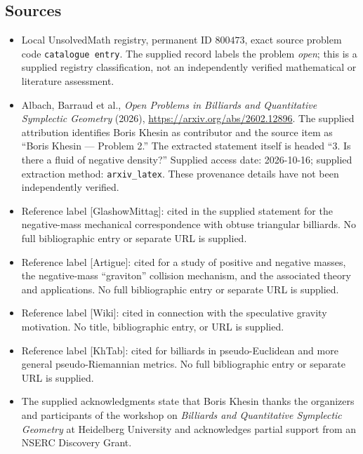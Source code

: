 \documentclass[11pt]{article}
\begin{document}
\subsection{Sources}
\begin{itemize}
\item Local UnsolvedMath registry, permanent ID \(800473\), exact source problem code \texttt{catalogue entry}. The supplied record labels the problem \emph{open}; this is a supplied registry classification, not an independently verified mathematical or literature assessment.
\item Albach, Barraud et al., \emph{Open Problems in Billiards and Quantitative Symplectic Geometry} (2026), \url{https://arxiv.org/abs/2602.12896}. The supplied attribution identifies Boris Khesin as contributor and the source item as ``Boris Khesin --- Problem 2.'' The extracted statement itself is headed ``3. Is there a fluid of negative density?'' Supplied access date: 2026-10-16; supplied extraction method: \texttt{arxiv\_latex}. These provenance details have not been independently verified.
\item Reference label [GlashowMittag]: cited in the supplied statement for the negative-mass mechanical correspondence with obtuse triangular billiards. No full bibliographic entry or separate URL is supplied.
\item Reference label [Artigue]: cited for a study of positive and negative masses, the negative-mass ``graviton'' collision mechanism, and the associated theory and applications. No full bibliographic entry or separate URL is supplied.
\item Reference label [Wiki]: cited in connection with the speculative gravity motivation. No title, bibliographic entry, or URL is supplied.
\item Reference label [KhTab]: cited for billiards in pseudo-Euclidean and more general pseudo-Riemannian metrics. No full bibliographic entry or separate URL is supplied.
\item The supplied acknowledgments state that Boris Khesin thanks the organizers and participants of the workshop on \emph{Billiards and Quantitative Symplectic Geometry} at Heidelberg University and acknowledges partial support from an NSERC Discovery Grant.
\end{itemize}
\end{document}
